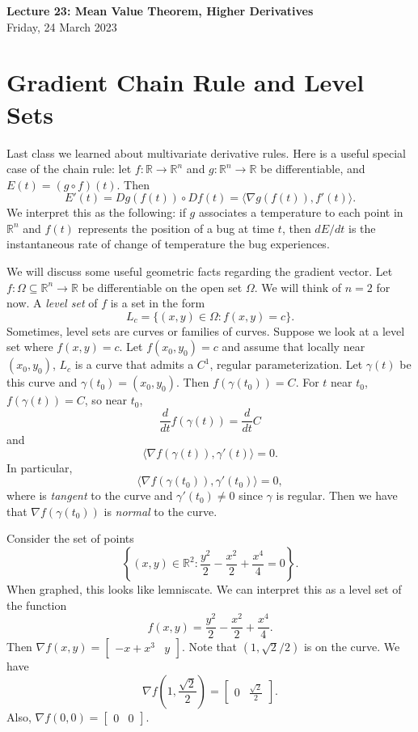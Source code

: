 \documentclass[11pt]{article}
\theoremstyle{definition}
\newcommand{\R}{\mathbb{R}}                      %
\newcommand{\mat}{\begin{bmatrix}}
\newcommand{\trix}{\end{bmatrix}}
\begin{document}
\thispagestyle{empty}

\begin{center}
{\LARGE \bf Lecture 23: Mean Value Theorem, Higher Derivatives}\\
{\large Friday, 24 March 2023}\\
\end{center}
\section{Gradient Chain Rule and Level Sets}
Last class we learned about multivariate derivative rules. Here is a useful special case of the chain rule: let $f:\R\to\R^n$ and $g:\R^n\to\R$ be differentiable, and $E(t)=(g\circ f)(t)$. Then 
$$
E'(t)=Dg(f(t))\circ Df(t) = \langle \nabla g(f(t)), f'(t)\rangle.
$$
We interpret this as the following: if $g$ associates a temperature to each point in $\R^n$ and $f(t)$ represents the position of a bug at time $t$, then $dE/dt$ is the instantaneous rate of change of temperature the bug experiences.

We will discuss some useful geometric facts regarding the gradient vector. Let $f:\Omega\subseteq \R^n\to\R$ be differentiable on the open set $\Omega$. We will think of $n=2$ for now. A \textit{level set} of $f$ is a set in the form
$$
L_c=\{(x,y)\in\Omega:f(x,y)=c\}.
$$
Sometimes, level sets are curves or families of curves. Suppose we look at a level set where $f(x,y)=c$. Let $f(x_0,y_0)=c$ and assume that locally near $(x_0,y_0)$, $L_c$ is a curve that admits a $C^1$, regular parameterization. Let $\gamma(t)$ be this curve and $\gamma(t_0)=(x_0,y_0)$. Then $f(\gamma(t_0))=C$. For $t$ near $t_0$, $f(\gamma(t))=C$, so near $t_0$,
$$
\frac{d}{dt}f(\gamma(t))=\frac{d}{dt}C
$$
and
$$
\langle \nabla f(\gamma(t)),\gamma'(t)\rangle=0.
$$
In particular,
$$
\langle \nabla f(\gamma(t_0)),\gamma'(t_0)\rangle=0,
$$
where is \textit{tangent} to the curve and $\gamma'(t_0)\neq 0$ since $\gamma$ is regular. Then we have that $\nabla f(\gamma(t_0))$ is \textit{normal} to the curve.

\ex Consider the set of points
$$
\left\{(x,y)\in\R^2:\frac{y^2}{2}-\frac{x^2}{2}+\frac{x^4}{4}=0\right\}.
$$
When graphed, this looks like lemniscate. We can interpret this as a level set of the function
$$
f(x,y)=\frac{y^2}{2}-\frac{x^2}{2}+\frac{x^4}{4}.
$$
Then $\nabla f(x,y)=\mat -x+x^3 & y\trix$. Note that $(1,\sqrt2/2)$ is on the curve. We have
$$
\nabla f\left(1,\frac{\sqrt2}{2}\right)=\mat 0 & \frac{\sqrt{2}}{2}\trix.
$$
Also, $\nabla f(0,0)=\mat 0&0 \trix$.
\end{document}
